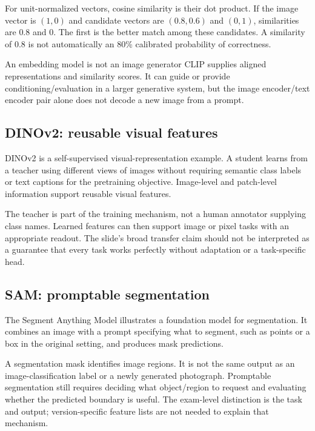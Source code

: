 \documentclass[11pt]{article}
\begin{document}
For unit-normalized vectors, cosine similarity is their dot product. If the image vector is $(1,0)$ and candidate vectors are $(0.8,0.6)$ and $(0,1)$, similarities are $0.8$ and 0. The first is the better match among these candidates. A similarity of 0.8 is not automatically an 80\% calibrated probability of correctness.

\begin{careful}{An embedding model is not an image generator}
CLIP supplies aligned representations and similarity scores. It can guide or provide conditioning/evaluation in a larger generative system, but the image encoder/text encoder pair alone does not decode a new image from a prompt.
\end{careful}

\subsection{DINOv2: reusable visual features}
DINOv2 is a self-supervised visual-representation example. A student learns from a teacher using different views of images without requiring semantic class labels or text captions for the pretraining objective. Image-level and patch-level information support reusable visual features.

The teacher is part of the training mechanism, not a human annotator supplying class names. Learned features can then support image or pixel tasks with an appropriate readout. The slide's broad transfer claim should not be interpreted as a guarantee that every task works perfectly without adaptation or a task-specific head.

\subsection{SAM: promptable segmentation}
The Segment Anything Model illustrates a foundation model for segmentation. It combines an image with a prompt specifying what to segment, such as points or a box in the original setting, and produces mask predictions.

A segmentation mask identifies image regions. It is not the same output as an image-classification label or a newly generated photograph. Promptable segmentation still requires deciding what object/region to request and evaluating whether the predicted boundary is useful. The exam-level distinction is the task and output; version-specific feature lists are not needed to explain that mechanism.
\end{document}
